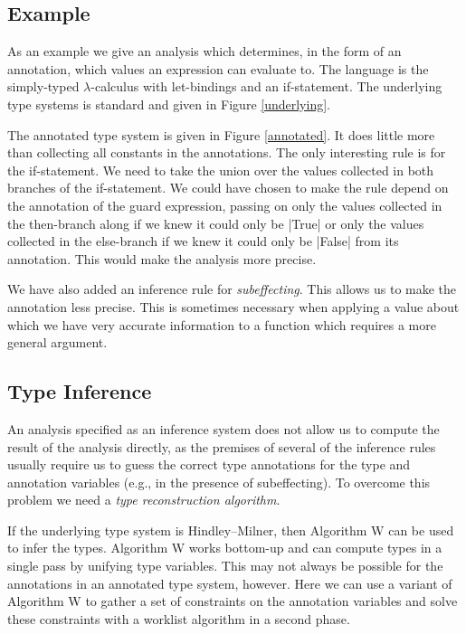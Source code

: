 \subsection{Example}

As an example we give an analysis which determines, in the form of an annotation, which values an expression can evaluate to. The language is the simply-typed $\lambda$-calculus with let-bindings and an if-statement. The underlying type systems is standard and given in Figure \ref{underlying}.

The annotated type system is given in Figure \ref{annotated}. It does little more than collecting all constants in the annotations. The only interesting rule is for the if-statement. We need to take the union over the values collected in both branches of the if-statement. We could have chosen to make the rule depend on the annotation of the guard expression, passing on only the values collected in the then-branch along if we knew it could only be |True| or only the values collected in the else-branch if we knew it could only be |False| from its annotation. This would make the analysis more precise.

We have also added an inference rule for \emph{subeffecting}. This allows us to make the annotation less precise. This is sometimes necessary when applying a value about which we have very accurate information to a function which requires a more general argument.

\subsection{Type Inference}

An analysis specified as an inference system does not allow us to compute the result of the analysis directly, as the premises of several of the inference rules usually require us to guess the correct type annotations for the type and annotation variables (e.g., in the presence of subeffecting). To overcome this problem we need a \emph{type reconstruction algorithm}.

If the underlying type system is Hindley--Milner, then Algorithm W can be used to infer the types. Algorithm W works bottom-up and can compute types in a single pass by unifying type variables. This may not always be possible for the annotations in an annotated type system, however. Here we can use a variant of Algorithm W to gather a set of constraints on the annotation variables and solve these constraints with a worklist algorithm in a second phase.

